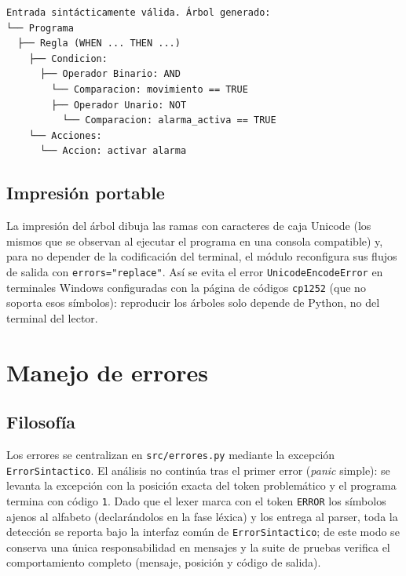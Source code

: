 \documentclass[12pt,a4paper]{article}
\begin{document}
\begin{lstlisting}
Entrada sintácticamente válida. Árbol generado:
└── Programa
  ├── Regla (WHEN ... THEN ...)
    ├── Condicion:
      ├── Operador Binario: AND
        └── Comparacion: movimiento == TRUE
        ├── Operador Unario: NOT
          └── Comparacion: alarma_activa == TRUE
    └── Acciones:
      └── Accion: activar alarma
\end{lstlisting}

\subsection{Impresión portable}
La impresión del árbol dibuja las ramas con caracteres de caja Unicode (los
mismos que se observan al ejecutar el programa en una consola compatible) y,
para no depender de la codificación del terminal, el módulo reconfigura sus
flujos de salida con \texttt{errors="replace"}. Así se evita el error
\texttt{UnicodeEncodeError} en terminales Windows configuradas con la página
de códigos \texttt{cp1252} (que no soporta esos símbolos): reproducir los
árboles solo depende de Python, no del terminal del lector.

\section{Manejo de errores}

\subsection{Filosofía}
Los errores se centralizan en \texttt{src/errores.py} mediante la excepción
\texttt{ErrorSintactico}. El análisis no continúa tras el primer error
(\emph{panic} simple): se levanta la excepción con la posición exacta del
token problemático y el programa termina con código \texttt{1}. Dado que el
lexer marca con el token \texttt{ERROR} los símbolos ajenos al alfabeto
(declarándolos en la fase léxica) y los entrega al parser, toda la detección
se reporta bajo la interfaz común de \texttt{ErrorSintactico}; de este modo se
conserva una única responsabilidad en mensajes y la suite de pruebas verifica
el comportamiento completo (mensaje, posición y código de salida).
\end{document}

